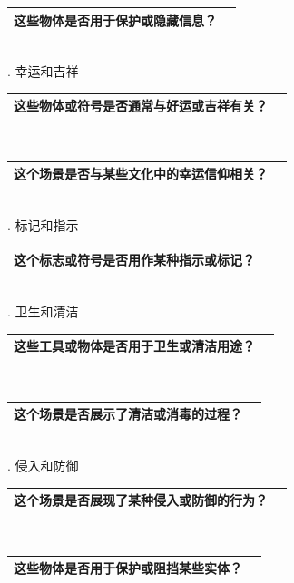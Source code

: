 \documentclass[12pt]{book}
\begin{document}
\begin{tabular}{|p{15cm}|p{3cm}|}
	\hline
这些物体是否用于保护或隐藏信息？\\
	\hline
\end{tabular}\\


. 幸运和吉祥

\begin{tabular}{|p{15cm}|p{3cm}|}
	\hline
这些物体或符号是否通常与好运或吉祥有关？\\
	\hline
\end{tabular}\\


\begin{tabular}{|p{15cm}|p{3cm}|}
	\hline
这个场景是否与某些文化中的幸运信仰相关？\\
	\hline
\end{tabular}\\


. 标记和指示

\begin{tabular}{|p{15cm}|p{3cm}|}
	\hline
这个标志或符号是否用作某种指示或标记？\\
	\hline
\end{tabular}\\


. 卫生和清洁

\begin{tabular}{|p{15cm}|p{3cm}|}
	\hline
这些工具或物体是否用于卫生或清洁用途？\\
	\hline
\end{tabular}\\




\begin{tabular}{|p{15cm}|p{3cm}|}
	\hline
这个场景是否展示了清洁或消毒的过程？\\
	\hline
\end{tabular}\\


. 侵入和防御

\begin{tabular}{|p{15cm}|p{3cm}|}
	\hline
这个场景是否展现了某种侵入或防御的行为？\\
	\hline
\end{tabular}\\



\begin{tabular}{|p{15cm}|p{3cm}|}
	\hline
这些物体是否用于保护或阻挡某些实体？\\
	\hline
\end{tabular}\\
\end{document}
